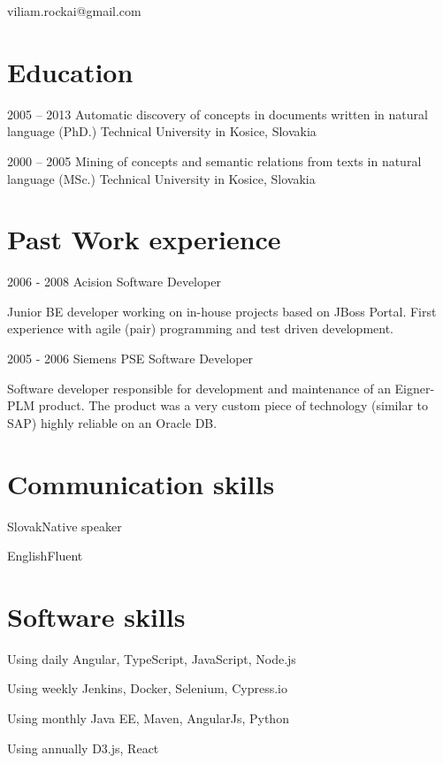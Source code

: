 \documentclass{tccv}
\begin{document}
    {}
    {viliam.rockai@gmail.com}

\section{Education}

\begin{yearlist}

\item[]{2005 -- 2013}
     {Automatic discovery of concepts in documents written in natural language (PhD.)}
     {Technical University in Kosice, Slovakia}

\item[]{2000 -- 2005}
     {Mining of concepts and semantic relations from texts in natural language (MSc.)}
     {Technical University in Kosice, Slovakia}

\end{yearlist}

\section{Past Work experience}
\begin{eventlist}
\item{2006 - 2008}
     {Acision}
     {Software Developer}

Junior BE developer working on in-house projects based on JBoss Portal. First experience with agile (pair) programming and test driven development.

\item{2005 - 2006}
     {Siemens PSE}
     {Software Developer}
     
Software developer responsible for development and maintenance of an Eigner-PLM product. The product was a very custom piece of technology (similar to SAP) highly reliable on an Oracle DB.
\end{eventlist}
\section{Communication skills}

\begin{factlist}
\item{Slovak}{Native speaker}
\item{English}{Fluent}
\end{factlist}

\section{Software skills}

\begin{factlist}

\item{Using daily}
     {Angular, TypeScript, JavaScript, Node.js}

\item{Using weekly}
     {Jenkins, Docker, Selenium, Cypress.io}

\item{Using monthly}
	 {Java EE, Maven, AngularJs, Python}

\item{Using annually}
	 {D3.js, React}

\end{factlist}
\end{document}
